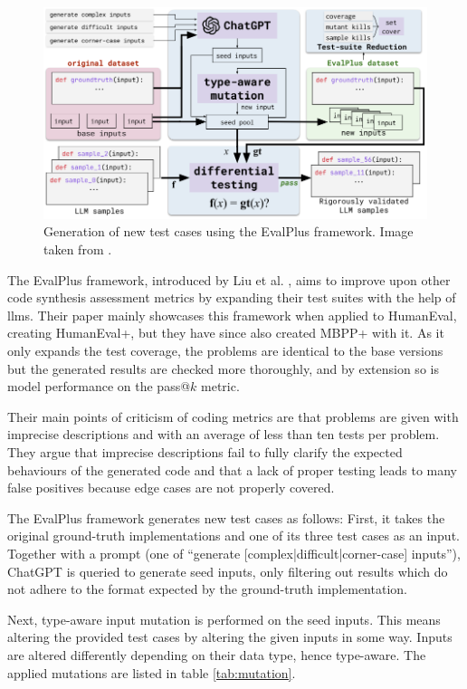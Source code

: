 \begin{figure}
    \centering
    \includegraphics[width=\textwidth]{bilder/kapitel2/evalplus.png}
    \caption{Generation of new test cases using the EvalPlus framework. Image taken from \cite{Liu.2024}.}
    \label{fig:evalplus}
\end{figure}

The EvalPlus framework, introduced by Liu et al. \cite{Liu.2024}, aims to improve upon other code synthesis assessment metrics by expanding their test suites with the help of \acp{llm}.
Their paper mainly showcases this framework when applied to HumanEval, creating HumanEval+, but they have since also created MBPP+ with it.
As it only expands the test coverage, the problems are identical to the base versions but the generated results are checked more thoroughly, and by extension so is model performance on the pass@$k$ metric.

Their main points of criticism of coding metrics are that problems are given with imprecise descriptions and with an average of less than ten tests per problem.
They argue that imprecise descriptions fail to fully clarify the expected behaviours of the generated code and that a lack of proper testing leads to many false positives because edge cases are not properly covered.

The EvalPlus framework generates new test cases as follows:
First, it takes the original ground-truth implementations and one of its three test cases as an input. Together with a prompt (one of \enquote{generate [complex|difficult|corner-case] inputs}), ChatGPT is queried to generate seed inputs, only filtering out results which do not adhere to the format expected by the ground-truth implementation.

Next, type-aware input mutation \cite{Winterer.2020} is performed on the seed inputs. This means altering the provided test cases by altering the given inputs in some way. Inputs are altered differently depending on their data type, hence type-aware. The applied mutations are listed in table \ref{tab:mutation}.

